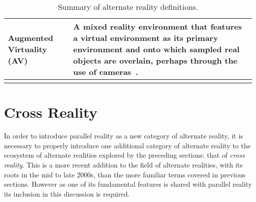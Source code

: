 \begin{center}
\begin{longtable}{ l p{10cm} }

Augmented Virtuality (AV) & A mixed reality environment that features a virtual environment as its primary environment and onto which sampled real objects are overlain, perhaps through the use of cameras~\cite{caballero:behand}. \\


\bottomrule
\caption{Summary of alternate reality definitions.}
\label{adopted-alternate-reality-definitions}
\end{longtable}
\end{center}






\section{Cross Reality}
\label{sec_crossreality}

\newcommand{\SLfootnote}{\footnote{Second Life.}}

In order to introduce parallel reality as a new category of alternate reality, it is necessary to properly introduce one additional category of alternate reality to the ecosystem of alternate realities explored by the preceding sections: that of \textit{cross reality}. This is a more recent addition to the field of alternate realities, with its roots in the mid to late 2000s, than the more familiar terms covered in previous sections. However as one of its fundamental features is shared with parallel reality its inclusion in this discussion is required.

